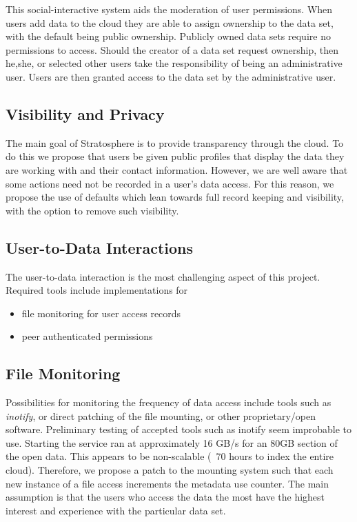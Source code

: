 \begin{multicols*}{2}
{This social-interactive system aids the moderation of user
permissions.  When users add data to the cloud they are able to assign
ownership to the data set, with the default being public
ownership. Publicly owned data sets require no permissions to access.
Should the creator of a data set request ownership, then he,she, or
selected other users take the responsibility of being an
administrative user.  Users are then granted access to the data set by
the administrative user.

\subsection{Visibility and Privacy}

The main goal of Stratosphere is to provide transparency through the
cloud. To do this we propose that users be given public profiles that
display the data they are working with and their contact information.
However, we are well aware that some actions need not be recorded in a
user's data access. For this reason, we propose the use of defaults
which lean towards full record keeping and visibility, with the option
to remove such visibility.

\subsection{User-to-Data Interactions}

The user-to-data interaction is the most challenging aspect of this
project. Required tools include implementations for
\begin{itemize}
\item file monitoring for user access records
\item peer authenticated permissions
\end{itemize}

\subsection{File Monitoring}

Possibilities for monitoring the frequency of data access include
tools such as \textit{inotify}, or direct patching of the file
mounting, or other proprietary/open software.  Preliminary testing of
accepted tools such as inotify seem improbable to use.  Starting the
service ran at approximately 16 GB/s for an 80GB section of the open
data. This appears to be non-scalable (~70 hours to index the entire
cloud). Therefore, we propose a patch to the mounting system such that
each new instance of a file access increments the metadata use
counter.  The main assumption is that the users who access the data
the most have the highest interest and experience with the particular
data set.

}
\end{multicols*}
